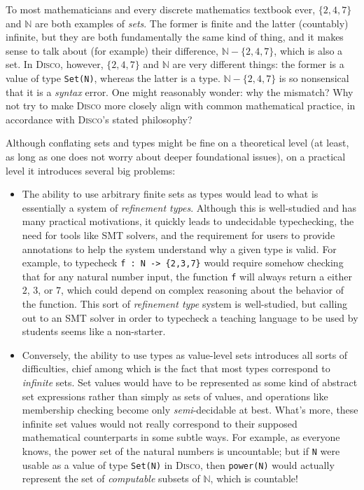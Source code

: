 \documentclass[submission,copyright,creativecommons]{eptcs}
\newcommand{\disco}{\textsc{Disco}\xspace}
\newcommand{\N}{\mathbb{N}}
\begin{document}
To most mathematicians and every discrete mathematics textbook ever,
$\{2,4,7\}$ and $\N$ are both examples of \emph{sets}.  The former is
finite and the latter (countably) infinite, but they are both
fundamentally the same kind of thing, and it makes sense to talk about
(for example) their difference, $\N - \{2,4,7\}$, which is also a set.
In \disco, however, $\{2,4,7\}$ and $\N$ are very different things:
the former is a value of type \texttt{Set(N)}, whereas the
latter is a type.  $\N - \{2,4,7\}$ is so nonsensical that it is a
\emph{syntax} error.  One might reasonably wonder: why the mismatch?
Why not try to make \disco more closely align with common mathematical
practice, in accordance with \disco's stated philosophy?

Although conflating sets and types might be fine on a theoretical
level (at least, as long as one does not worry about deeper
foundational issues), on a practical level it introduces several
big problems:

\begin{itemize}
\item The ability to use arbitrary finite sets as types would lead to
  what is essentially a system of \emph{refinement types}.  Although
  this is well-studied and has many practical motivations, it quickly
  leads to undecidable typechecking, the need for tools like SMT
  solvers, and the requirement for users to provide annotations to
  help the system understand why a given type is valid.  For example,
  to typecheck %
  \verb|f : N -> {2,3,7}| would require somehow checking that for any
  natural number input, the function \verb|f| will always return a
  either $2$, $3$, or $7$, which could depend on complex reasoning
  about the behavior of the function.  This sort of \emph{refinement type} system
  is well-studied, but calling out to an SMT solver in order to
  typecheck a teaching language to be used by students seems like a
  non-starter.
\item Conversely, the ability to use types as value-level sets
  introduces all sorts of difficulties, chief among which is the fact
  that most types correspond to \emph{infinite} sets.  Set values
  would have to be represented as some kind of abstract set
  expressions rather than simply as sets of values, and operations
  like membership checking become only \emph{semi}-decidable at best.
  What's more, these infinite set values would not really correspond
  to their supposed mathematical counterparts in some subtle ways.
  For example, as everyone knows, the power set of the natural numbers
  is uncountable; but if \texttt{N} were usable as a value of type
  \texttt{Set(N)} in \disco, then \texttt{power(N)} would actually
  represent the set of \emph{computable} subsets of $\N$, which is
  countable!
\end{itemize}
\end{document}
